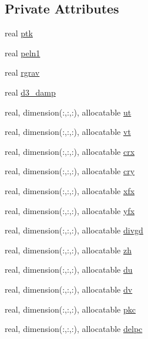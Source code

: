 \subsection*{Private Attributes}
\begin{DoxyCompactItemize}
\item 
real \hyperlink{classdyn__core__mod_a8743542bdd5648cf4f95698e51afc601}{ptk}
\item 
real \hyperlink{classdyn__core__mod_a4a524216d71d2a5973c30736ce76deb4}{peln1}
\item 
real \hyperlink{classdyn__core__mod_ae3293d99dac97da219d947fa14fe4b81}{rgrav}
\item 
real \hyperlink{classdyn__core__mod_ab65a8777b1bd81dcfc1b7cfed5a974c5}{d3\-\_\-damp}
\item 
real, dimension(\-:,\-:,\-:), allocatable \hyperlink{classdyn__core__mod_a759f692eeae8f494dd172747b34ef905}{ut}
\item 
real, dimension(\-:,\-:,\-:), allocatable \hyperlink{classdyn__core__mod_ae72eb5ce40fd8affec5a6642475e80ba}{vt}
\item 
real, dimension(\-:,\-:,\-:), allocatable \hyperlink{classdyn__core__mod_adc731c91709904f8c6939a47285ec0ce}{crx}
\item 
real, dimension(\-:,\-:,\-:), allocatable \hyperlink{classdyn__core__mod_ab16557a82a1a0be81d478b8c69606d8c}{cry}
\item 
real, dimension(\-:,\-:,\-:), allocatable \hyperlink{classdyn__core__mod_a0318e308d1a1f5accf19d8b901feebe5}{xfx}
\item 
real, dimension(\-:,\-:,\-:), allocatable \hyperlink{classdyn__core__mod_afd231d83bc8c9d07ddff91e7dfe0c0ec}{yfx}
\item 
real, dimension(\-:,\-:,\-:), allocatable \hyperlink{classdyn__core__mod_a7b77379648e83296d79064ebbc7928e6}{divgd}
\item 
real, dimension(\-:,\-:,\-:), allocatable \hyperlink{classdyn__core__mod_ac211efe06fd0edadef972c82951f4c4f}{zh}
\item 
real, dimension(\-:,\-:,\-:), allocatable \hyperlink{classdyn__core__mod_ac9c0730e7747e9cb1f3be62a5565672a}{du}
\item 
real, dimension(\-:,\-:,\-:), allocatable \hyperlink{classdyn__core__mod_a24c8aa084ba37e9006be8bfd96588330}{dv}
\item 
real, dimension(\-:,\-:,\-:), allocatable \hyperlink{classdyn__core__mod_ab8b896d9a395406f68b58a26d444f9bf}{pkc}
\item 
real, dimension(\-:,\-:,\-:), allocatable \hyperlink{classdyn__core__mod_aa4417385939b0cafbeadaa424ed3c914}{delpc}

\end{DoxyCompactItemize}
